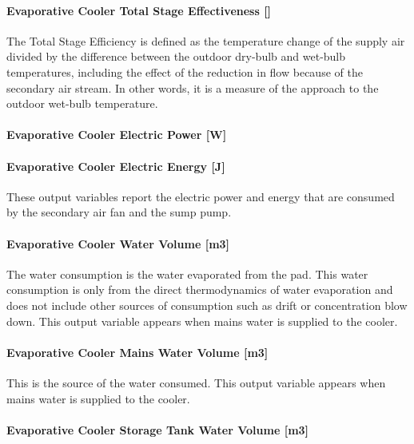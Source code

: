 \paragraph{Evaporative Cooler Total Stage Effectiveness {[]}}\label{evaporative-cooler-total-stage-effectiveness-1}

The Total Stage Efficiency is defined as the temperature change of the supply air divided by the difference between the outdoor dry-bulb and wet-bulb temperatures, including the effect of the reduction in flow because of the secondary air stream. In other words, it is a measure of the approach to the outdoor wet-bulb temperature.

\paragraph{Evaporative Cooler Electric Power {[}W{]}}\label{evaporative-cooler-electric-power-w}

\paragraph{Evaporative Cooler Electric Energy {[}J{]}}\label{evaporative-cooler-electric-energy-j-3}

These output variables report the electric power and energy that are consumed by the secondary air fan and the sump pump.

\paragraph{Evaporative Cooler Water Volume {[}m3{]}}\label{evaporative-cooler-water-volume-m3-2}

The water consumption is the water evaporated from the pad. This water consumption is only from the direct thermodynamics of water evaporation and does not include other sources of consumption such as drift or concentration blow down. This output variable appears when mains water is supplied to the cooler.

\paragraph{Evaporative Cooler Mains Water Volume {[}m3{]}}\label{evaporative-cooler-mains-water-volume-m3-3}

This is the source of the water consumed. This output variable appears when mains water is supplied to the cooler.

\paragraph{Evaporative Cooler Storage Tank Water Volume {[}m3{]}}\label{evaporative-cooler-storage-tank-water-volume-m3-3}

